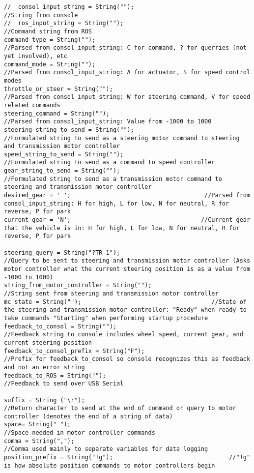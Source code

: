 \begin{lstlisting}[breaklines=true,basicstyle=\tiny]
//  consol_input_string = String("");                               //String from console
//  ros_input_string = String("");                                  //Command string from ROS
command_type = String("");                                      //Parsed from consol_input_string: C for command, ? for querries (not yet involved), etc
command_mode = String("");                                      //Parsed from consol_input_string: A for actuator, S for speed control modes
throttle_or_steer = String("");                                 //Parsed from consol_input_string: W for steering command, V for speed related commands
steering_command = String("");                                  //Parsed from consol_input_string: Value from -1000 to 1000 
steering_string_to_send = String("");                           //Formulated string to send as a steering motor command to steering and transmission motor controller
speed_string_to_send = String("");                              //Formulated string to send as a command to speed controller
gear_string_to_send = String("");                               //Formulated string to send as a transmission motor command to steering and transmission motor controller
desired_gear = ' ';                                      //Parsed from consol_input_string: H for high, L for low, N for neutral, R for reverse, P for park
current_gear = 'N';                                     //Current gear that the vehicle is in: H for high, L for low, N for neutral, R for reverse, P for park

steering_query = String("?TR 1");                               //Query to be sent to steering and transmission motor controller (Asks motor controller what the current steering position is as a value from -1000 to 1000)
string_from_motor_controller = String("");                      //String sent from steering and transmission motor controller
mc_state = String("");                                     //State of the steering and transmission motor controller: "Ready" when ready to take commands "Starting" when performing startup procedure
feedback_to_consol = String("");                                //Feedback string to console includes wheel speed, current gear, and current steering position
feedback_to_consol_prefix = String("F");                        //Prefix for feedback_to_consol so console recognizes this as feedback and not an error string
feedback_to_ROS = String("");                                   //Feedback to send over USB Serial

suffix = String ("\r");                                         //Return character to send at the end of command or query to motor controller (denotes the end of a string of data)
space= String(" ");                                             //Space needed in motor controller commands
comma = String(",");                                            //Comma used mainly to separate variables for data logging
position_prefix = String("!g");                                 //"!g" is how absolute position commands to motor controllers begin


\end{lstlisting}
